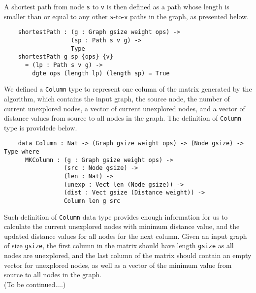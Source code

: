 A shortest path from node \texttt{s} to \texttt{v} is then defined as a path whose length is smaller than or equal to any other \texttt{s}-to-\texttt{v} paths in the graph, as presented below. 

\begin{lstlisting}
	shortestPath : (g : Graph gsize weight ops) ->
	               (sp : Path s v g) ->
	               Type
	shortestPath g sp {ops} {v}
	  = (lp : Path s v g) ->
	    dgte ops (length lp) (length sp) = True
\end{lstlisting}

We defined a \texttt{Column} type to represent one column of the matrix generated by the algorithm, which contains the input graph, the source node, the number of current unexplored nodes, a vector of current unexplored nodes, and a vector of distance values from source to all nodes in the graph. The definition of \texttt{Column} type is providede below. 

\begin{lstlisting}
	data Column : Nat -> (Graph gsize weight ops) -> (Node gsize) -> Type where
	  MKColumn : (g : Graph gsize weight ops) ->
	             (src : Node gsize) ->
	             (len : Nat) ->
	             (unexp : Vect len (Node gsize)) ->
	             (dist : Vect gsize (Distance weight)) ->
	             Column len g src

\end{lstlisting}
Such definition of \texttt{Column} data type provides enough information for us to calculate the current unexplored nodes with minimum distance value, and the updated distance values for all nodes for the next column. Given an input graph of size \texttt{gsize}, the first column in the matrix should have length \texttt{gsize} as all nodes are unexplored, and the last column of the matrix should contain an empty vector for unexplored nodes, as well as a vector of the minimum value from source to all nodes in the graph. 
\\


(To be continued....)
